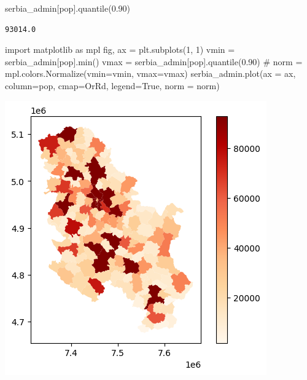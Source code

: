 \documentclass[
  letterpaper,
  DIV=11,
  numbers=noendperiod]{scrreprt}
\newenvironment{Shaded}{\begin{snugshade}}{\end{snugshade}}
\newcommand{\BuiltInTok}[1]{\textcolor[rgb]{0.00,0.23,0.31}{#1}}
\newcommand{\CommentTok}[1]{\textcolor[rgb]{0.37,0.37,0.37}{#1}}
\newcommand{\DecValTok}[1]{\textcolor[rgb]{0.68,0.00,0.00}{#1}}
\newcommand{\FloatTok}[1]{\textcolor[rgb]{0.68,0.00,0.00}{#1}}
\newcommand{\ImportTok}[1]{\textcolor[rgb]{0.00,0.46,0.62}{#1}}
\newcommand{\NormalTok}[1]{\textcolor[rgb]{0.00,0.23,0.31}{#1}}
\newcommand{\OperatorTok}[1]{\textcolor[rgb]{0.37,0.37,0.37}{#1}}
\newcommand{\StringTok}[1]{\textcolor[rgb]{0.13,0.47,0.30}{#1}}
\newcommand{\VariableTok}[1]{\textcolor[rgb]{0.07,0.07,0.07}{#1}}
\begin{document}
\begin{Shaded}
\begin{Highlighting}[]
\NormalTok{serbia\_admin[}\StringTok{\textquotesingle{}pop\textquotesingle{}}\NormalTok{].quantile(}\FloatTok{0.90}\NormalTok{)}
\end{Highlighting}
\end{Shaded}

\begin{verbatim}
93014.0
\end{verbatim}

\begin{Shaded}
\begin{Highlighting}[]
\ImportTok{import}\NormalTok{ matplotlib }\ImportTok{as}\NormalTok{ mpl}
\NormalTok{fig, ax }\OperatorTok{=}\NormalTok{ plt.subplots(}\DecValTok{1}\NormalTok{, }\DecValTok{1}\NormalTok{)}
\NormalTok{vmin }\OperatorTok{=}\NormalTok{ serbia\_admin[}\StringTok{\textquotesingle{}pop\textquotesingle{}}\NormalTok{].}\BuiltInTok{min}\NormalTok{()}
\NormalTok{vmax }\OperatorTok{=}\NormalTok{ serbia\_admin[}\StringTok{\textquotesingle{}pop\textquotesingle{}}\NormalTok{].quantile(}\FloatTok{0.90}\NormalTok{) }\CommentTok{\# }
\NormalTok{norm }\OperatorTok{=}\NormalTok{ mpl.colors.Normalize(vmin}\OperatorTok{=}\NormalTok{vmin, vmax}\OperatorTok{=}\NormalTok{vmax)}
\NormalTok{serbia\_admin.plot(ax }\OperatorTok{=}\NormalTok{ ax, column}\OperatorTok{=}\StringTok{\textquotesingle{}pop\textquotesingle{}}\NormalTok{, cmap}\OperatorTok{=}\StringTok{\textquotesingle{}OrRd\textquotesingle{}}\NormalTok{, legend}\OperatorTok{=}\VariableTok{True}\NormalTok{, norm }\OperatorTok{=}\NormalTok{ norm)}
\end{Highlighting}
\end{Shaded}

\includegraphics{labs/w02_maps_files/figure-pdf/cell-38-output-1.png}
\end{document}
